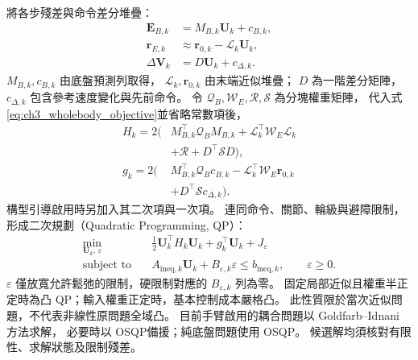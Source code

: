 將各步殘差與命令差分堆疊：
\begin{equation}
    \begin{aligned}
        \mathbf E_{B,k}&=M_{B,k}\mathbf U_k+c_{B,k},\\
        \mathbf r_{E,k}&\approx\mathbf r_{0,k}-\mathcal L_k\mathbf U_k,\\
        \Delta\mathbf V_k&=D\mathbf U_k+c_{\Delta,k}.
    \end{aligned}
    \label{eq:ch3_stacked_objective_maps}
\end{equation}
$M_{B,k},c_{B,k}$ 由底盤預測列取得，
$\mathcal L_k,\mathbf r_{0,k}$ 由末端近似堆疊；
$D$ 為一階差分矩陣，$c_{\Delta,k}$ 包含參考速度變化與先前命令。
令 $\mathcal Q_B,\mathcal W_E,\mathcal R,\mathcal S$ 為分塊權重矩陣，
代入式\eqref{eq:ch3_wholebody_objective}並省略常數項後，
\begin{equation}
    \begin{aligned}
        H_k=2\big(&M_{B,k}^\top\mathcal Q_B M_{B,k}
        +\mathcal L_k^\top\mathcal W_E\mathcal L_k\\
        &+\mathcal R+D^\top\mathcal S D\big),\\
        g_k=2\big(&M_{B,k}^\top\mathcal Q_B c_{B,k}
        -\mathcal L_k^\top\mathcal W_E\mathbf r_{0,k}\\
        &+D^\top\mathcal S c_{\Delta,k}\big).
    \end{aligned}
    \label{eq:ch3_wholebody_qp_cost_matrices}
\end{equation}
構型引導啟用時另加入其二次項與一次項。
連同命令、關節、輪級與避障限制，形成二次規劃（Quadratic Programming, QP）：
\begin{equation}
    \begin{aligned}
        \min_{\mathbf U_k,\,\varepsilon}\quad&
        \frac12\mathbf U_k^\top H_k\mathbf U_k
        +g_k^\top\mathbf U_k+J_\varepsilon\\
        \text{subject to}\quad&
        A_{\mathrm{ineq},k}\mathbf U_k
        +B_{\varepsilon,k}\varepsilon\leq b_{\mathrm{ineq},k},
        \qquad\varepsilon\geq0 .
    \end{aligned}
    \label{eq:ch3_wholebody_qp}
\end{equation}
$\varepsilon$ 僅放寬允許鬆弛的限制，硬限制對應的 $B_{\varepsilon,k}$ 列為零。
固定局部近似且權重半正定時為凸 QP；輸入權重正定時，基本控制成本嚴格凸。
此性質限於當次近似問題，不代表非線性原問題全域凸。
目前手臂啟用的耦合問題以 Goldfarb--Idnani 方法\cite{goldfarb1983dual}求解，
必要時以 OSQP\cite{stellato2020osqp}備援；純底盤問題使用 OSQP。
候選解均須核對有限性、求解狀態及限制殘差。

